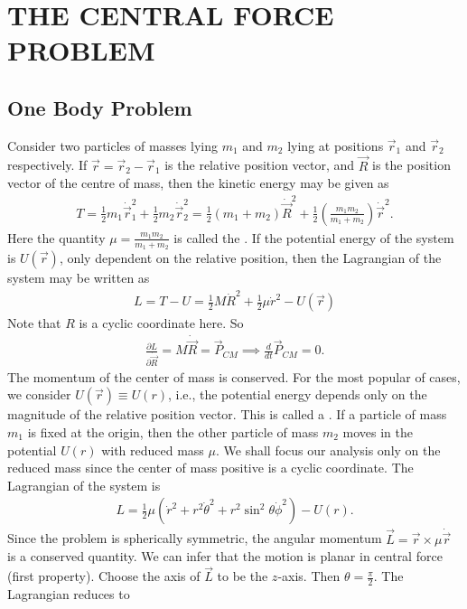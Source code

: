 \chapter{THE CENTRAL FORCE PROBLEM}

\section{One Body Problem}
Consider two particles of masses lying $m_{1}$ and $m_{2}$ lying at positions $\vec{r}_{1}$ and $\vec{r}_{2}$ respectively. If $\vec{r} = \vec{r}_{2}-\vec{r}_{1}$ is the relative position vector, and $\vec{R}$ is the position vector of the centre of mass, then the kinetic energy may be given as
\begin{align}
    T = \frac{1}{2}m_{1}\dot{\vec{r}}_{1}^{2} + \frac{1}{2}m_{2}\dot{\vec{r}}_{2}^{2} = \frac{1}{2}(m_{1}+m_{2})\dot{\vec{R}}^{2} + \frac{1}{2}\left( \frac{m_{1}m_{2}}{m_{1}+m_{2}} \right) \dot{\vec{r}}^{2}.
\end{align}
Here the quantity $\mu = \frac{m_{1}m_{2}}{m_{1}+m_{2}}$ is called the . If the potential energy of the system is $U(\vec{r})$, only dependent on the relative position, then the Lagrangian of the system may be written as
\begin{align}
    L = T-U = \frac{1}{2}M\dot{R}^{2} + \frac{1}{2}\mu \dot{r}^{2} - U(\vec{r})
\end{align}
Note that $R$ is a cyclic coordinate here. So
\begin{align}
    \frac{\partial L}{\partial \dot{\vec{R}}} = M\dot{\vec{R}} = \vec{P}_{CM} \implies \frac{d}{dt} \vec{P}_{CM} = 0.
\end{align}
The momentum of the center of mass is conserved. For the most popular of cases, we consider $U(\vec{r}) \equiv U(r)$, i.e., the potential energy depends only on the magnitude of the relative position vector. This is called a . If a particle of mass $m_{1}$ is fixed at the origin, then the other particle of mass $m_{2}$ moves in the potential $U(r)$ with reduced mass $\mu$. We shall focus our analysis only on the reduced mass since the center of mass positive is a cyclic coordinate. The Lagrangian of the system is
\begin{align}
    L = \frac{1}{2}\mu(\dot{r}^{2} + r^{2}\dot{\theta}^{2} + r^{2}\sin^{2}\theta \dot{\phi}^{2}) - U(r).
\end{align}
Since the problem is spherically symmetric, the angular momentum $\vec{L} = \vec{r} \times \mu \dot{\vec{r}}$ is a conserved quantity. We can infer that the motion is planar in central force (first property). Choose the axis of $\vec{L}$ to be the $z$-axis. Then $\theta = \frac{\pi}{2}$. The Lagrangian reduces to
